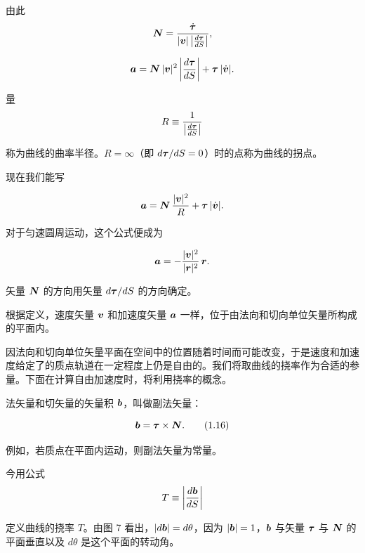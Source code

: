 由此
\begin{equation*}
\bm{N} = \frac{\dot{\bm{\tau}}}{|\bm{v}|\left|\frac{d\bm{\tau}}{dS}\right|},
\end{equation*}

\begin{equation*}
\bm{a} = \bm{N}\,|\bm{v}|^{2}\left|\frac{d\bm{\tau}}{dS}\right| + \bm{\tau}\,|\dot{\bm{v}}|.
\end{equation*}

量
\begin{equation*}
R \equiv \frac{1}{\left|\frac{d\bm{\tau}}{dS}\right|}
\end{equation*}

称为曲线的曲率半径。$R = \infty$（即 $d\bm{\tau}/dS = 0$）时的点称为曲线的拐点。

现在我们能写

\begin{equation*}
\bm{a} = \bm{N}\,\frac{|\bm{v}|^{2}}{R} + \bm{\tau}\,|\dot{\bm{v}}|.
\end{equation*}

对于匀速圆周运动，这个公式便成为

\begin{equation*}
\bm{a} = -\frac{|\bm{v}|^{2}}{|\bm{r}|^{2}}\,\bm{r}.
\end{equation*}

矢量 $\bm{N}$ 的方向用矢量 $d\bm{\tau}/dS$ 的方向确定。

根据定义，速度矢量 $\bm{v}$ 和加速度矢量 $\bm{a}$ 一样，位于由法向和切向单位矢量所构成的平面内。

因法向和切向单位矢量平面在空间中的位置随着时间而可能改变，于是速度和加速度给定了的质点轨道在一定程度上仍是自由的。我们将取曲线的挠率作为合适的参量。下面在计算自由加速度时，将利用挠率的概念。

法矢量和切矢量的矢量积 $\bm{b}$，叫做副法矢量：

\begin{equation}
\bm{b} = \bm{\tau} \times \bm{N}.
\tag{1.16}
\end{equation}

例如，若质点在平面内运动，则副法矢量为常量。

今用公式
\begin{equation*}
T \equiv \left|\frac{d\bm{b}}{dS}\right|
\end{equation*}

定义曲线的挠率 $T$。由图 7 看出，$|d\bm{b}| = d\theta$，因为 $|\bm{b}| = 1$，$\bm{b}$ 与矢量 $\bm{\tau}$ 与 $\bm{N}$ 的平面垂直以及 $d\theta$ 是这个平面的转动角。

